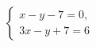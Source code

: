 \begin{ex}
	\begin{condition}
		\( \left\{
		\begin{array}{l}
			x-y-7=0,\\
			3x-y+7=6
		\end{array}
		\right. \)
	\end{condition}
\end{ex}